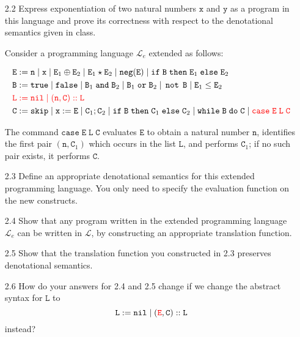 \documentclass[a4paper,10pt]{article}
\newcommand{\E}{\mathtt{E}}
\newcommand{\B}{\mathtt{B}}
\newcommand{\C}{\mathtt{C}}
\newcommand{\LL}{\mathtt{L}}
\newcommand{\true}{\mathtt{true}}
\newcommand{\false}{\mathtt{false}}
\newcommand{\andsym}{\mathtt{and}}
\newcommand{\orsym}{\mathtt{or}}
\newcommand{\notsym}{\mathop{\mathtt{not}}}
\newcommand{\ifsym}{\mathtt{if}}
\newcommand{\then}{\mathtt{then}}
\newcommand{\elsesym}{\mathtt{else}}
\newcommand{\whilesym}{\mathtt{while}}
\newcommand{\dosym}{\mathtt{do}}
\newcommand{\skipsym}{\mathtt{skip}}
\newcommand{\nil}{\mathtt{nil}}
\newcommand{\case}{\mathtt{case}}
\newcommand{\negation}{\mathtt{neg}}
\newcommand{\question}[1]
{\color{DarkBlue}#1 \color{Black} \newline}
\begin{document}
\begin{enumerate}
\question{
\item[2.2] Express exponentiation of two natural numbers $\mathtt{x}$ and $\mathtt{y}$ as a program
in this language and prove its correctness with respect to the denotational semantics given in class.

Consider a programming language $\mathcal{L}_e$ extended as follows:

\begin{align*}
& \E := \mathtt{n} \; | \; \mathtt{x} \; | \; \E_1 \oplus \E_2 \; | \; \E_1 \star \E_2 \; | \; \negation(\E) \; | \; \ifsym \; \B \; \then \; \E_1 \; \elsesym \; \E_2 \\
& \B := \true \; | \; \false \; | \; \B_1 \; \andsym \; \B_2 \; | \; \B_1 \; \orsym \; \B_2 \; | \; \notsym \; \B \; | \; \E_1 \leq \E_2 \\
& {\color{red} \LL := \nil \; | \; (\mathtt{n},\C)::\LL} \\
& \C := \skipsym \; | \; \mathtt{x} := \E \; | \; \C_1 ; \C_2 \; | \; \ifsym \; \B \; \then \; \C_1 \; \elsesym \; \C_2 \; | \; \whilesym \; \B \; \dosym \; \C \; | \; {\color{red} \case \; \E \; \LL \; \C}
\end{align*}

The command $\case \; \E \; \LL \; \C$ evaluates $\E$ to obtain a natural number $\mathtt{n}$,
identifies the first pair $(\mathtt{n},\C_1)$ which occurs in the list $\LL$, and performs $\C_1$;
if no such pair exists, it performs $\C$.
}


\question{
\item[2.3] Define an appropriate denotational semantics for this extended programming language. 
You only need to specify the evaluation function on the new constructs.
}

\question{
\item[2.4] Show that any program written in the extended programming language $\mathcal{L}_e$ 
can be written in $\mathcal{L}$, by constructing an appropriate translation function.
}

\question{
\item[2.5] Show that the translation function you constructed in 2.3 preserves denotational semantics.
}

\question{
\item[2.6] How do your answers for 2.4 and 2.5 change if we change the abstract syntax for $\LL$ to
\[ \LL := \nil \; | \; ({\color{red} \E},\C)::\LL \]
instead?
}

\end{enumerate}
\end{document}
